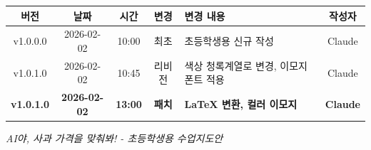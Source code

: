 \documentclass[12pt,a4paper]{article}
\begin{document}
\begin{center}
\small
\begin{tabular}{|c|c|c|c|p{4.5cm}|c|}
\hline
\textbf{버전} & \textbf{날짜} & \textbf{시간} & \textbf{변경} & \textbf{변경 내용} & \textbf{작성자} \\
\hline
v1.0.0.0 & 2026-02-02 & 10:00 & 최초 & 초등학생용 신규 작성 & Claude \\
\hline
v1.0.1.0 & 2026-02-02 & 10:45 & 리비전 & 색상 청록계열로 변경, 이모지 폰트 적용 & Claude \\
\hline
\textbf{v1.0.1.0} & \textbf{2026-02-02} & \textbf{13:00} & \textbf{패치} & \textbf{LaTeX 변환, 컬러 이모지} & \textbf{Claude} \\
\hline
\end{tabular}
\end{center}

\vspace{1cm}
\begin{center}
\large\itshape
{} AI야, 사과 가격을 맞춰봐! - 초등학생용 수업지도안
\end{center}
\end{document}
